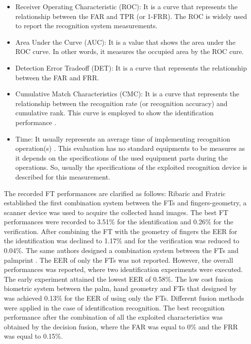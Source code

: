 \documentclass[review]{elsarticle}
\begin{document}
\begin{itemize}
		\item Receiver Operating Characteristic (ROC): It is a curve that represents the relationship between the FAR and TPR (or 1-FRR). The ROC is widely used	to report the recognition system measurements.
		\item Area Under the Curve (AUC): It is a value that shows the area under the ROC curve. In other words, it measures the occupied area by the ROC cure.
		\item Detection Error Tradeoff (DET): It is a curve that represents the relationship between the FAR and FRR.
		\item Cumulative Match Characteristics (CMC): It is a curve that represents the relationship between the recognition rate (or recognition accuracy) and cumulative rank. This curve is employed to show the identification performance \cite{Kumar2012Human}.
		\item Time: It usually represents an average time of implementing recognition operation(s) \cite{jaswal2016knuckle}. This evaluation has no standard equipments to be measures as it depends on the specifications of the used equipment parts during the operations. So, usually the specifications of the exploited recognition device is described for this measurement.
	\end{itemize}
	The recorded FT performances are clarified as follows: Ribaric and Fratric \cite{Ribaric2005Anonline} established the first combination system between the FTs and fingers-geometry, a scanner device was used to acquire the collected hand images. 
	The best FT performances were recorded to 3.51\% for the identification and 0.26\% for the verification. After combining the FT with the geometry of fingers the EER for the identification was declined to 1.17\% and for the verification was reduced to 0.04\%. The same authors designed a combination system between the FTs and palmprint \cite{Ribaric2005ABiometric}. The EER of only the FTs was not reported. However, the overall performances was reported, where two identification experiments were executed. The early experiment attained the lowest EER of 0.58\%. The low cost fusion biometric system between the palm, hand geometry and FTs that designed by \cite{Ferrer2007Low} was achieved 0.13\% for the EER of using only the FTs. Different fusion methods were applied in the case of identification recognition. The best recognition performance after the combination of all the exploited characteristics was obtained by the decision fusion, where the FAR was equal to 0\% and the FRR was equal to 0.15\%.
\end{document}
